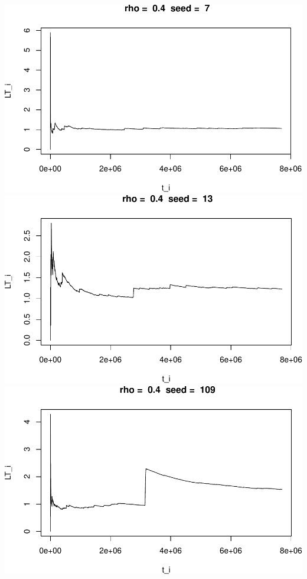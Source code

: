 \documentclass[]{article}
\begin{document}
\includegraphics{003_files/figure-latex/unnamed-chunk-13-1.pdf}
\includegraphics{003_files/figure-latex/unnamed-chunk-13-2.pdf}
\includegraphics{003_files/figure-latex/unnamed-chunk-13-3.pdf}
\end{document}
